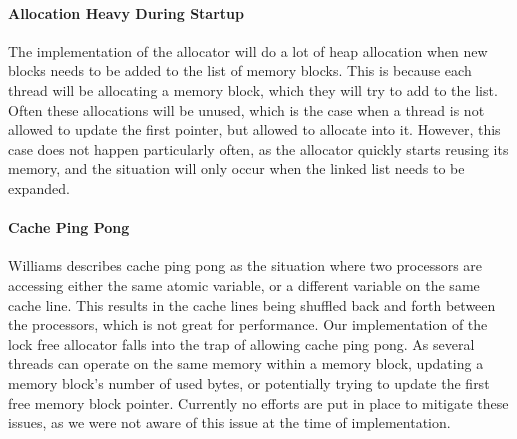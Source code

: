 \paragraph{Allocation Heavy During Startup}
The implementation of the allocator will do a lot of heap allocation when new blocks needs to be added to the list of memory blocks.
This is because each thread will be allocating a memory block, which they will try to add to the list.
Often these allocations will be unused, which is the case when a thread is not allowed to update the first pointer, but allowed to allocate into it.
However, this case does not happen particularly often, as the allocator quickly starts reusing its memory, and the situation will only occur when
the linked list needs to be expanded.

\paragraph{Cache Ping Pong}
\label{detailed_lock_free_ping_pong}
Williams\cite{williams_safety_off} describes cache ping pong as the situation where two processors
are accessing either the same atomic variable, or a different variable on the same cache line.
This results in the cache lines being shuffled back and forth between the processors, which is not great for performance.
Our implementation of the lock free allocator falls into the trap of allowing cache ping pong.
As several threads can operate on the same memory within a memory block, updating a memory block's number of used bytes, or
potentially trying to update the first free memory block pointer.
Currently no efforts are put in place to mitigate these issues, as we were not aware of this issue at the time of implementation.
